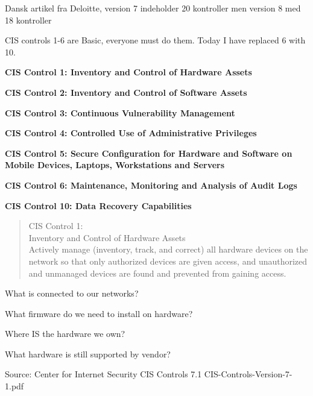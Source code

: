 \documentclass[Screen16to9,17pt]{foils}
\begin{document}
Dansk artikel fra Deloitte, version 7 indeholder 20 kontroller men version 8 med 18 kontroller\\



CIS controls 1-6 are Basic, everyone must do them. Today I have replaced 6 with 10.

\begin{list2}
\item {\bf CIS Control 1: Inventory and Control of Hardware Assets}
\item {\bf CIS Control 2: Inventory and Control of Software Assets}
\item {\bf CIS Control 3: Continuous Vulnerability Management}
\item {\bf CIS Control 4: Controlled Use of Administrative Privileges}
\item {\bf CIS Control 5:
Secure Configuration for Hardware and Software on Mobile Devices, Laptops, Workstations and Servers}
\item {\bf CIS Control 6: Maintenance, Monitoring and Analysis of Audit Logs}
\item {\bf CIS Control 10: Data Recovery Capabilities}
\end{list2}



\begin{quote}
CIS Control 1:\\
Inventory and Control of Hardware Assets\\
Actively manage (inventory, track, and correct) all hardware devices on the network so that only authorized devices are given access, and unauthorized and unmanaged devices are found and prevented from gaining access.
\end{quote}

\begin{list1}
\item What is connected to our networks?
\item What firmware do we need to install on hardware?
\item Where IS the hardware we own?
\item What hardware is still supported by vendor?
\end{list1}

Source: Center for Internet Security CIS Controls 7.1 CIS-Controls-Version-7-1.pdf
\end{document}
